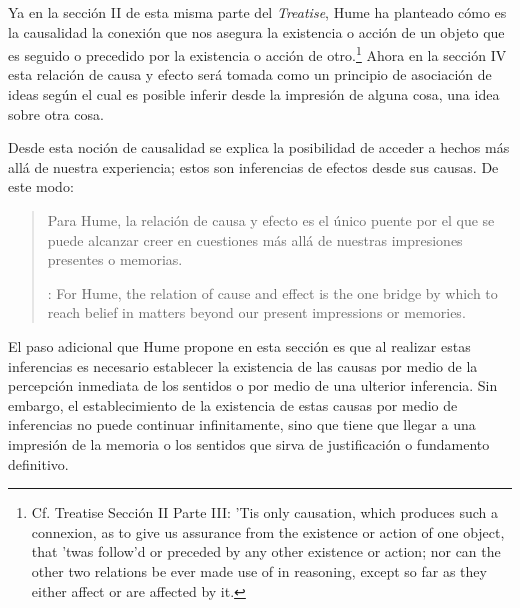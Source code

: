 Ya en la sección II de esta misma parte del \emph{Treatise}, Hume ha planteado
cómo es la causalidad la conexión que nos asegura la existencia o acción de un
objeto que es seguido o precedido por la existencia o acción de
otro.\footnote{Cf. Treatise Sección II Parte III: ’Tis only causation, which
  produces such a connexion, as to give us assurance from the existence or
  action of one object, that ’twas follow’d or preceded by any other existence
  or action; nor can the other two relations be ever made use of in reasoning,
  except so far as they either affect or are affected by it. }
Ahora en la sección IV esta relación de causa y efecto será tomada como un
principio de asociación de ideas según el cual es posible inferir desde la
impresión de alguna cosa, una idea sobre otra cosa.

Desde esta noción de causalidad se explica la posibilidad de acceder a hechos
más allá de nuestra experiencia; estos son inferencias de efectos desde sus
causas. De este modo: \blockquote[{\cite[87]{anscombe1981hjc}}: For Hume, the
relation of cause and effect is the one bridge by which to reach belief in
matters beyond our present impressions or memories.]{Para Hume, la relación de
  causa y efecto es el único puente por el que se puede alcanzar creer en
  cuestiones más allá de nuestras impresiones presentes o memorias.}

El paso adicional que Hume propone en esta sección es que al realizar estas
inferencias es necesario establecer la existencia de las causas por medio de la
percepción inmediata de los sentidos o por medio de una ulterior inferencia. Sin
embargo, el establecimiento de la existencia de estas causas por medio de
inferencias no puede continuar infinitamente, sino que tiene que llegar a una
impresión de la memoria o los sentidos que sirva de justificación o fundamento
definitivo.

